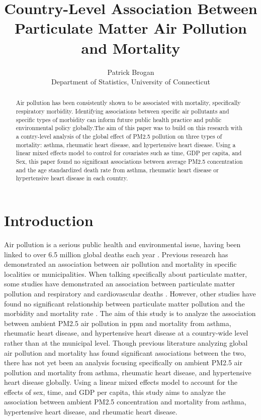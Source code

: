 \documentclass[12pt, letterpaper, twoside]{article}\usepackage[]{graphicx}\usepackage[]{xcolor}
\title{Country-Level Association Between Particulate Matter Air Pollution and Mortality}
\author{Patrick Brogan\\[1ex]
  Department of Statistics, University of Connecticut\\}
\begin{document}
\maketitle

\begin{abstract}
Air pollution has been consistently shown to be associated with mortality,
specifically respiratory morbidity. Identifying associations between specific
air pollutants and specific types of morbidity can inform future public health
practice and public environmental policy globally.The aim of this paper was to
build on this research with a contry-level analysis of the global effect of
PM2.5 pollution on three types of mortality: asthma, rheumatic heart disease,
and hypertensive heart disease. Using a linear mixed effects model to control
for covariates such as time, GDP per capita, and Sex, this paper found no
significant associations between average PM2.5 concentration and the age
standardized death rate from asthma, rheumatic heart disease or hypertensive
heart disease in each country.
\end{abstract}

\section*{Introduction}
Air pollution is a serious public health and environmental issue, having been
linked to over 6.5 million global deaths each year \citep{fuller2022pollution}.
Previous research has demonstrated an association between air pollution and
mortality in specific localities or municipalities\citep{dockery1993association,
sunyer1996air, jerrett2005spatial, analitis2006short}. When talking specifically
about particulate matter, some studies have demonstrated an association between
particulate matter pollution and respiratory and cardiovascular deaths
\citep{analitis2006short}. However, other studies have found no significant
relationship between particulate matter pollution and the morbidity and
mortality rate \citep{khojasteh2021long}. The aim of this study is to analyze
the association between ambient PM2.5 air pollution in ppm and mortality from
asthma, rheumatic heart disease, and hypertensive heart disease at a country-wide
level rather than at the municipal level. Though previous literature analyzing
global air pollution and mortality has found significant associations between
the two, there has not yet been an analysis focusing specifically on ambient
PM2.5 air pollution and mortality from asthma, rheumatic heart disease, and
hypertensive heart disease globally. Using a linear mixed effects model to
account for the effects of sex, time, and GDP per capita, this study aims to
analyze the association between ambient PM2.5 concentration and mortality from
asthma, hypertensive heart disease, and rheumatic heart disease.
\end{document}
